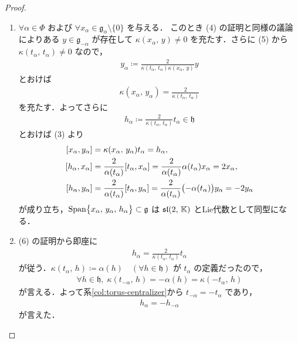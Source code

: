 \documentclass[rep_main]{subfiles}
\begin{document}
\begin{proof}
\begin{enumerate}
		\item $\forall \alpha \in \Phi$ および $\forall x_\alpha \in \mathfrak{g}_\alpha \setminus \{0\}$ を与える．
		このとき (4) の証明と同様の議論によりある $y \in \mathfrak{g}_{-\alpha}$ が存在して $\kappa(x_\alpha,\, y) \neq 0$ を充たす．さらに (5) から $\kappa(t_\alpha,\, t_\alpha) \neq 0$ なので，
		\begin{align}
			y_\alpha \coloneqq \frac{2}{\kappa(t_\alpha,\, t_\alpha)\kappa(x_\alpha,\, y)} y
		\end{align}
		とおけば
		\begin{align}
			\kappa(x_\alpha,\, y_\alpha) = \frac{2}{\kappa(t_\alpha,\, t_\alpha)}
		\end{align}
		を充たす．よってさらに
		\begin{align}
			h_\alpha \coloneqq \frac{2}{\kappa(t_\alpha,\, t_\alpha)} t_\alpha \in \mathfrak{h}
		\end{align}
		とおけば (3) より
		\begin{align}
			\comm{x_\alpha}{y_\alpha} &= \kappa(x_\alpha,\, y_\alpha) t_\alpha = h_\alpha, \\
			\comm{h_\alpha}{x_\alpha} &= \frac{2}{\alpha(t_\alpha)} \comm{t_\alpha}{x_\alpha} = \frac{2}{\alpha(t_\alpha)}\alpha(t_\alpha) x_\alpha = 2x_\alpha, \\
			\comm{h_\alpha}{y_\alpha} &= \frac{2}{\alpha(t_\alpha)} \comm{t_\alpha}{y_\alpha} = \frac{2}{\alpha(t_\alpha)}\bigl(-\alpha(t_\alpha)\bigr) y_\alpha = -2y_\alpha
		\end{align}
		が成り立ち，$\operatorname{Span} \bigl\{x_\alpha,\, y_\alpha,\, h_\alpha\bigr\} \subset \mathfrak{g}$ は $\mathfrak{sl} (2,\, \mathbb{K})$ とLie代数として同型になる．

		\item (6) の証明から即座に
		\begin{align}
			h_\alpha = \frac{2}{\kappa(t_\alpha,\, t_\alpha)} t_\alpha
		\end{align}
		が従う．$\kappa(t_\alpha,\, h) \coloneqq \alpha(h)\quad (\forall h \in \mathfrak{h})$ が $t_\alpha$ の定義だったので，
		\begin{align}
			\forall h \in \mathfrak{h},\; \kappa(t_{-\alpha},\, h) = -\alpha(h) = \kappa(-t_{\alpha},\, h)
		\end{align}
		が言える．よって系\ref{col:torus-centralizer}から $t_{-\alpha} = -t_\alpha$ であり，
		\begin{align}
			h_\alpha = -h_{-\alpha}
		\end{align}
		が言えた．
	\end{enumerate}
	
\end{proof}
\end{document}
